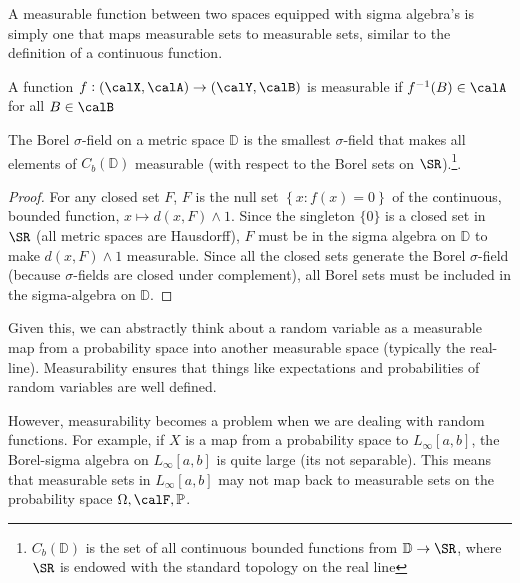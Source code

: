 A measurable function between two spaces equipped with sigma algebra's is simply one that maps measurable sets to measurable sets, similar to the definition of a continuous function. 

\begin{definition}
	A function  \(f:(\calX, \calA) \to (\calY, \calB)\) is measurable if  \(f^{-1}(B)\in\calA\) for all  \(B \in \calB\)	
\end{definition}

\begin{lemma}
	\label{lemma:vdv1.3.1}
	The Borel \(\sigma\)-field on a metric space \(\mathbb{D}\) is the smallest  \(\sigma\)-field that makes all elements of \(C_b(\mathbb{D})\) measurable (with respect to the Borel sets on  \(\SR\)).\footnote{\(C_b(\mathbb{D})\) is the set of all continuous bounded functions from  \(\mathbb{D}\to\SR\), where  \(\SR\) is endowed with the standard topology on the real line}.
\end{lemma}
\begin{proof}
	For any closed set \(F\), \(F\) is the null set  \(\left\{x:f(x)=0\right\}\) of the continuous, bounded function, \(x \mapsto d(x,F)\land 1\). Since the singleton  \(\{0\}\) is a closed set in  \(\SR\) (all metric spaces are Hausdorff),  \(F\) must be in the sigma algebra on  \(\mathbb{D}\) to make  \(d(x,F)\land 1\) measurable. Since all the closed sets generate the Borel  \(\sigma\)-field (because \(\sigma\)-fields are closed under complement), all Borel sets must be included in the sigma-algebra on \(\mathbb{D}\).
\end{proof}


Given this, we can abstractly think about a random variable as a measurable map from a probability space into another measurable space (typically the real-line). Measurability ensures that things like expectations and probabilities of random variables are well defined.

However, measurability becomes a problem when we are dealing with random functions. For example, if \(X\) is a map from a probability space to  \(L_\infty[a,b]\), the Borel-sigma algebra on  \(L_\infty[a,b]\) is quite large (its not separable). This means that measurable sets in  \(L_\infty[a,b]\) may not map back to measurable sets on the probability space \(\Omega, \calF, \P\). 

